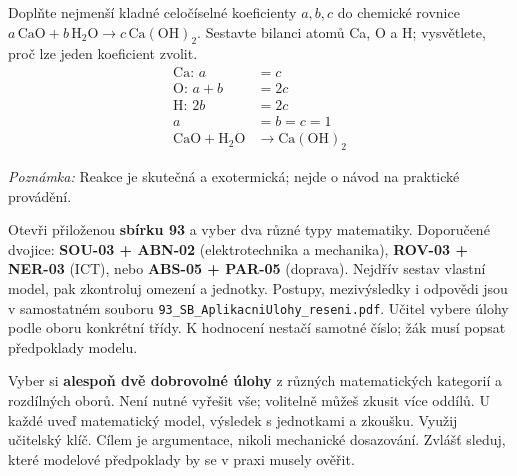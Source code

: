 \documentclass[11pt,a4paper]{article}
\begin{document}
\begin{prikladReseniBox}[title={Příklad 7}]
Doplňte nejmenší kladné celočíselné koeficienty $a,b,c$ do chemické rovnice $a\,\mathrm{CaO}+b\,\mathrm{H_2O}\rightarrow c\,\mathrm{Ca(OH)_2}$. Sestavte bilanci atomů Ca, O a H; vysvětlete, proč lze jeden koeficient zvolit.
\tcblower
\[\begin{aligned}
\text{Ca: }a&=c\\\text{O: }a+b&=2c\\\text{H: }2b&=2c\\a&=b=c=1\\\mathrm{CaO+H_2O}&\rightarrow\mathrm{Ca(OH)_2}
\end{aligned}\]
\par\textit{Poznámka:} Reakce je skutečná a exotermická; nejde o návod na praktické provádění.
\end{prikladReseniBox}
\begin{zadaniReseniBox}[title={Samostatná práce 1}]
Otevři přiloženou \textbf{sbírku 93} a vyber dva různé typy matematiky. Doporučené dvojice: \textbf{SOU-03 + ABN-02} (elektrotechnika a mechanika), \textbf{ROV-03 + NER-03} (ICT), nebo \textbf{ABS-05 + PAR-05} (doprava). Nejdřív sestav vlastní model, pak zkontroluj omezení a jednotky.
\tcblower
Postupy, mezivýsledky i odpovědi jsou v samostatném souboru \texttt{93\_SB\_AplikacniUlohy\_reseni.pdf}. Učitel vybere úlohy podle oboru konkrétní třídy. K hodnocení nestačí samotné číslo; žák musí popsat předpoklady modelu.
\end{zadaniReseniBox}
\begin{zadaniReseniBox}[title={Rozšíření 1}]
Vyber si \textbf{alespoň dvě dobrovolné úlohy} z různých matematických kategorií a rozdílných oborů. Není nutné vyřešit vše; volitelně můžeš zkusit více oddílů. U každé uveď matematický model, výsledek s jednotkami a zkoušku.
\tcblower
Využij učitelský klíč. Cílem je argumentace, nikoli mechanické dosazování. Zvlášť sleduj, které modelové předpoklady by se v praxi musely ověřit.
\end{zadaniReseniBox}
\end{document}
